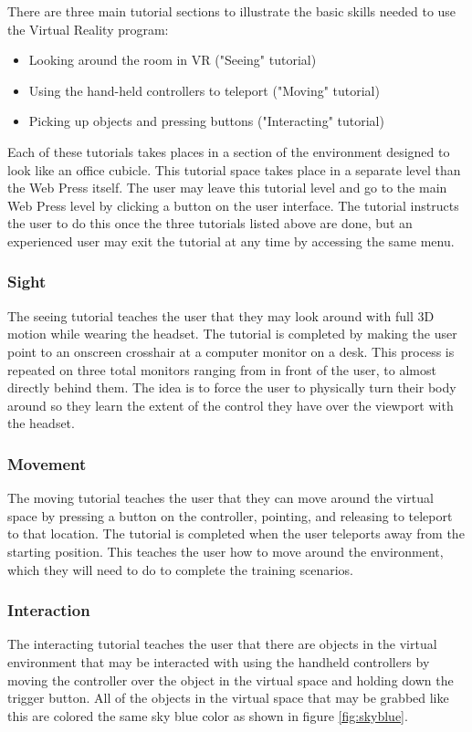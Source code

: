 \documentclass[onecolumn, draftclsnofoot,10pt, compsoc]{IEEEtran}
\begin{document}
There are three main tutorial sections to illustrate the basic skills needed to use the Virtual Reality program:

\begin{itemize}
    \item Looking around the room in VR ("Seeing" tutorial)
    \item Using the hand-held controllers to teleport ("Moving" tutorial)
    \item Picking up objects and pressing buttons ("Interacting" tutorial)
\end{itemize}

Each of these tutorials takes places in a section of the environment designed to look like an office cubicle. This tutorial space takes place in a separate level than the Web Press itself. The user may leave this tutorial level and go to the main Web Press level by clicking a button on the user interface. The tutorial instructs the user to do this once the three tutorials listed above are done, but an experienced user may exit the tutorial at any time by accessing the same menu.

\subsubsection{Sight}
The seeing tutorial teaches the user that they may look around with full 3D motion while wearing the headset. The tutorial is completed by making the user point to an onscreen crosshair at a computer monitor on a desk. This process is repeated on three total monitors ranging from in front of the user, to almost directly behind them. The idea is to force the user to physically turn their body around so they learn the extent of the control they have over the viewport with the headset.

\subsubsection{Movement}
The moving tutorial teaches the user that they can move around the virtual space by pressing a button on the controller, pointing, and releasing to teleport to that location. The tutorial is completed when the user teleports away from the starting position. This teaches the user how to move around the environment, which they will need to do to complete the training scenarios.   

\subsubsection{Interaction}
The interacting tutorial teaches the user that there are objects in the virtual environment that may be interacted with using the handheld controllers by moving the controller over the object in the virtual space and holding down the trigger button. All of the objects in the virtual space that may be grabbed like this are colored the same sky blue color as shown in figure \ref{fig:skyblue}.
\end{document}
